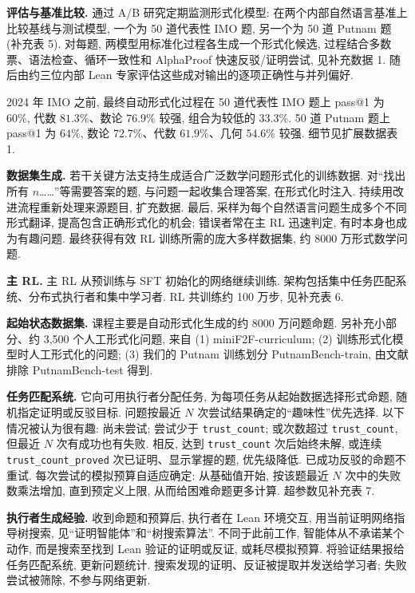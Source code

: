 \noindent\textbf{评估与基准比较.} 通过 A/B 研究定期监测形式化模型: 在两个内部自然语言基准上比较基线与测试模型, 一个为 50 道代表性 IMO 题, 另一个为 50 道 Putnam 题 (补充表 5). 对每题, 两模型用标准化过程各生成一个形式化候选, 过程结合多数票、语法检查、循环一致性和 AlphaProof 快速反驳/证明尝试, 见补充数据 1. 随后由约三位内部 Lean 专家评估这些成对输出的逐项正确性与并列偏好.

2024 年 IMO 之前, 最终自动形式化过程在 50 道代表性 IMO 题上 pass@1 为 $60\%$, 代数 $81.3\%$、数论 $76.9\%$ 较强, 组合为较低的 $33.3\%$. 50 道 Putnam 题上 pass@1 为 $64\%$, 数论 $72.7\%$、代数 $61.9\%$、几何 $54.6\%$ 较强. 细节见扩展数据表 1.

\noindent\textbf{数据集生成.} 若干关键方法支持生成适合广泛数学问题形式化的训练数据. 对“找出所有 $n$……”等需要答案的题, 与问题一起收集合理答案, 在形式化时注入. 持续用改进流程重新处理来源题目, 扩充数据. 最后, 采样为每个自然语言问题生成多个不同形式翻译, 提高包含正确形式化的机会; 错误者常在主 RL 迅速判定, 有时本身也成为有趣问题. 最终获得有效 RL 训练所需的庞大多样数据集, 约 8000 万形式数学问题.

\noindent\textbf{主 RL.} 主 RL 从预训练与 SFT 初始化的网络继续训练. 架构包括集中任务匹配系统、分布式执行者和集中学习者. RL 共训练约 100 万步, 见补充表 6.

\noindent\textbf{起始状态数据集.} 课程主要是自动形式化生成的约 8000 万问题命题. 另补充小部分、约 3,500 个人工形式化问题, 来自 (1) miniF2F-curriculum\cite{alphaproof-ref24}; (2) 训练形式化模型时人工形式化的问题; (3) 我们的 Putnam 训练划分 PutnamBench-train, 由文献\cite{alphaproof-ref21}排除 PutnamBench-test 得到.

\noindent\textbf{任务匹配系统.} 它向可用执行者分配任务, 为每项任务从起始数据选择形式命题, 随机指定证明或反驳目标. 问题按最近 $N$ 次尝试结果确定的“趣味性”优先选择. 以下情况被认为很有趣: 尚未尝试; 尝试少于 \texttt{trust\_count}; 或次数超过 \texttt{trust\_count}, 但最近 $N$ 次有成功也有失败. 相反, 达到 \texttt{trust\_count} 次后始终未解, 或连续 \texttt{trust\_count\_proved} 次已证明、显示掌握的题, 优先级降低. 已成功反驳的命题不重试. 每次尝试的模拟预算自适应确定: 从基础值开始, 按该题最近 $N$ 次中的失败数乘法增加, 直到预定义上限, 从而给困难命题更多计算. 超参数见补充表 7.

\noindent\textbf{执行者生成经验.} 收到命题和预算后, 执行者在 Lean 环境交互, 用当前证明网络指导树搜索, 见“证明智能体”和“树搜索算法”. 不同于此前工作\cite{alphaproof-ref2}, 智能体从不承诺某个动作, 而是搜索至找到 Lean 验证的证明或反证, 或耗尽模拟预算. 将验证结果报给任务匹配系统, 更新问题统计. 搜索发现的证明、反证被提取并发送给学习者; 失败尝试被筛除, 不参与网络更新.

